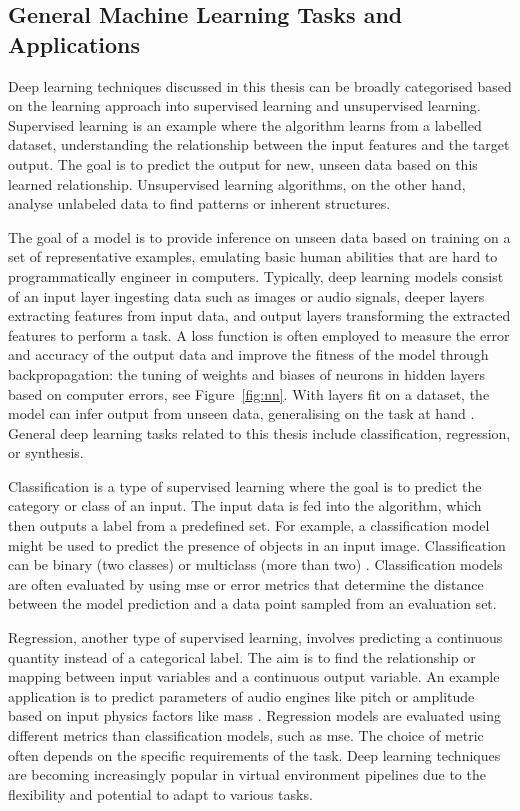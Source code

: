 \subsection{General Machine Learning Tasks and Applications}
Deep learning techniques discussed in this thesis can be broadly categorised based on the learning approach into supervised learning and unsupervised learning. Supervised learning is an example where the algorithm learns from a labelled dataset, understanding the relationship between the input features and the target output. The goal is to predict the output for new, unseen data based on this learned relationship. Unsupervised learning algorithms, on the other hand, analyse unlabeled data to find patterns or inherent structures.\par
The goal of a model is to provide inference on unseen data based on training on a set of representative examples, emulating basic human abilities that are hard to programmatically engineer in computers. Typically, deep learning models consist of an input layer ingesting data such as images or audio signals, deeper layers extracting features from input data, and output layers transforming the extracted features to perform a task. A loss function is often employed to measure the error and accuracy of the output data and improve the fitness of the model through backpropagation: the tuning of weights and biases of neurons in hidden layers based on computer errors, see Figure~\ref{fig:nn}. With layers fit on a dataset, the model can infer output from unseen data, generalising on the task at hand \citep{szeliski2022computer}. General deep learning tasks related to this thesis include classification, regression, or synthesis.\par
Classification is a type of supervised learning where the goal is to predict the category or class of an input. The input data is fed into the algorithm, which then outputs a label from a predefined set. For example, a classification model might be used to predict the presence of objects in an input image. Classification can be binary (two classes) or multiclass (more than two) \citep{goodfellow2016deep}. Classification models are often evaluated by using \acrfull{mse} or error metrics that determine the distance between the model prediction and a data point sampled from an evaluation set.\par
Regression, another type of supervised learning, involves predicting a continuous quantity instead of a categorical label. The aim is to find the relationship or mapping between input variables and a continuous output variable. An example application is to predict parameters of audio engines like pitch or amplitude based on input physics factors like mass \citep{colombo2021psychometric}. Regression models are evaluated using different metrics than classification models, such as \acrfull{mse}. The choice of metric often depends on the specific requirements of the task. Deep learning techniques are becoming increasingly popular in virtual environment pipelines due to the flexibility and potential to adapt to various tasks.\par
